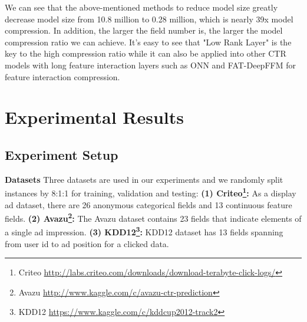 \documentclass[sigconf]{acmart}
\begin{document}
We can see that the above-mentioned methods to reduce model size greatly decrease model size from 10.8 million to 0.28 million, which is nearly 39x model compression. In addition, the larger the field number  is, the larger the model compression ratio we can achieve. It's easy to see that "Low Rank Layer" is the key to the high compression ratio  while it can also be applied into other CTR models with long feature interaction layers such as ONN\cite{onn} and FAT-DeepFFM\cite{fat} for feature interaction compression.

\section{Experimental Results}
\subsection{Experiment Setup}
\textbf{Datasets}
Three datasets are used in our experiments and we randomly split instances by 8:1:1 for training, validation and testing:
\textbf{(1) Criteo\footnote{Criteo \url{http://labs.criteo.com/downloads/download-terabyte-click-logs/}}:}
  As a display ad dataset, there are 26 anonymous categorical fields and 13 continuous feature fields.
\textbf{(2) Avazu\footnote{Avazu \url{http://www.kaggle.com/c/avazu-ctr-prediction}}:}
The Avazu dataset contains 23 fields that indicate elements of a single ad impression.
\textbf{(3) KDD12\footnote{KDD12 \url{https://www.kaggle.com/c/kddcup2012-track2}}:}
  KDD12 dataset has 13 fields spanning from user id to ad position for a clicked data.
  
\end{document}
